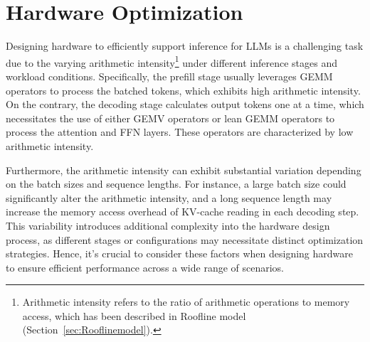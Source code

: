 \section{Hardware Optimization}
\label{sec:hardware-optimization}


Designing hardware to efficiently support inference for LLMs is a challenging task due to the varying arithmetic intensity\footnote{Arithmetic intensity refers to the ratio of arithmetic operations to memory access, which has been described in Roofline model (Section~\ref{sec:Rooflinemodel}).} under different inference stages and workload conditions. 
Specifically, the prefill stage usually leverages GEMM operators to process the batched tokens, which exhibits high arithmetic intensity. On the contrary, the decoding stage calculates output tokens one at a time, which necessitates the use of either GEMV operators or lean GEMM operators to process the attention and FFN layers. These operators are characterized by low arithmetic intensity.  


Furthermore, the arithmetic intensity can exhibit substantial variation depending on the batch sizes and sequence lengths. For instance, a large batch size could significantly alter the arithmetic intensity, and a long sequence length may increase the memory access overhead of  KV-cache reading in each decoding step. This variability introduces additional complexity into the hardware design process, as different stages or configurations may necessitate distinct optimization strategies. Hence, it's crucial to consider these factors when designing hardware to ensure efficient performance across a wide range of scenarios.

